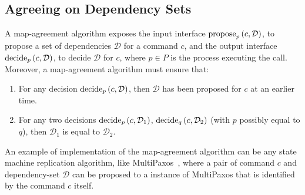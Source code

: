 \subsection{Agreeing on Dependency Sets}
\label{map-algo}

A map-agreement algorithm exposes the input interface $\operatorname{propose}_p\left( c, \mathcal{D} \right)$, to propose a set of dependencies $\mathcal{D}$ for a command $c$, and the output interface $\operatorname{decide}_p\left( c, \mathcal{D} \right)$, to decide $\mathcal{D}$ for $c$, where $p\in P$ is the process executing the call.
Moreover, a map-agreement algorithm must ensure that: 
\begin{comment}
\begin{enumerate}[noitemsep,nolistsep]
    \item If the set of dependencies $\mathcal{D}$ is decided for a command $c$, then $\mathcal{D}$ has been proposed for $c$ at an earlier time.
    \item If $\mathcal{D}_1$ is decided for a command $c$ and $\mathcal{D}_2$ is decided for the same command $c$, then $\mathcal{D}_1$ is equal to $\mathcal{D}_2$.
 \end{enumerate}

\todo{OR MORE FORMALLY}

\end{comment}

\begin{enumerate}
    \item For any decision $\operatorname{decide}_p\left( c, \mathcal{D} \right)$, then $\mathcal{D}$ has been proposed for $c$ at an earlier time.
    \item For any two decisions $\operatorname{decide}_p\left( c, \mathcal{D}_1 \right)$, $\operatorname{decide}_q\left( c, \mathcal{D}_2 \right)$ (with $p$ possibly equal to $q$), then $\mathcal{D}_1$ is equal to $\mathcal{D}_2$.


\end{enumerate}

An example of implementation of the map-agreement algorithm can be any state machine replication algorithm, like MultiPaxos~\cite{paxos-made-simple}, where a pair of command $c$ and dependency-set $\mathcal{D}$ can be proposed to a instance of MultiPaxos that is identified by the command $c$ itself.





